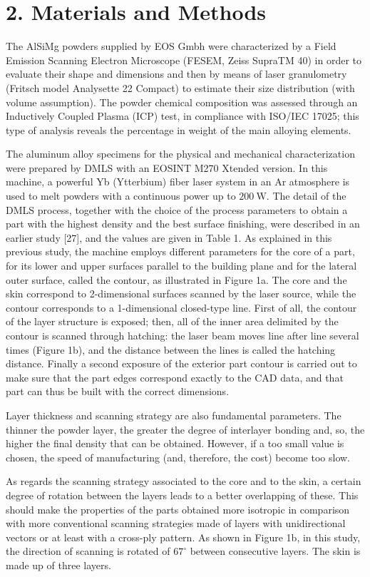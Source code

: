 \documentclass[10pt]{article}
\begin{document}
\section*{2. Materials and Methods}
The AlSiMg powders supplied by EOS Gmbh were characterized by a Field Emission Scanning Electron Microscope (FESEM, Zeiss SupraTM 40) in order to evaluate their shape and dimensions and then by means of laser granulometry (Fritsch model Analysette 22 Compact) to estimate their size distribution (with volume assumption). The powder chemical composition was assessed through an Inductively Coupled Plasma (ICP) test, in compliance with ISO/IEC 17025; this type of analysis reveals the percentage in weight of the main alloying elements.

The aluminum alloy specimens for the physical and mechanical characterization were prepared by DMLS with an EOSINT M270 Xtended version. In this machine, a powerful Yb (Ytterbium) fiber laser system in an Ar atmosphere is used to melt powders with a continuous power up to $200 \mathrm{~W}$. The detail of the DMLS process, together with the choice of the process parameters to obtain a part with the highest density and the best surface finishing, were described in an earlier study [27], and the values are given in Table 1. As explained in this previous study, the machine employs different parameters for the core of a part, for its lower and upper surfaces parallel to the building plane and for the lateral outer surface, called the contour, as illustrated in Figure 1a. The core and the skin correspond to 2-dimensional surfaces scanned by the laser source, while the contour corresponds to a 1-dimensional closed-type line. First of all, the contour of the layer structure is exposed; then, all of the inner area delimited by the contour is scanned through hatching: the laser beam moves line after line several times (Figure 1b), and the distance between the lines is called the hatching distance. Finally a second exposure of the exterior part contour is carried out to make sure that the part edges correspond exactly to the CAD data, and that part can thus be built with the correct dimensions.

Layer thickness and scanning strategy are also fundamental parameters. The thinner the powder layer, the greater the degree of interlayer bonding and, so, the higher the final density that can be obtained. However, if a too small value is chosen, the speed of manufacturing (and, therefore, the cost) become too slow.

As regards the scanning strategy associated to the core and to the skin, a certain degree of rotation between the layers leads to a better overlapping of these. This should make the properties of the parts obtained more isotropic in comparison with more conventional scanning strategies made of layers with unidirectional vectors or at least with a cross-ply pattern. As shown in Figure 1b, in this study, the direction of scanning is rotated of $67^{\circ}$ between consecutive layers. The skin is made up of three layers.
\end{document}

